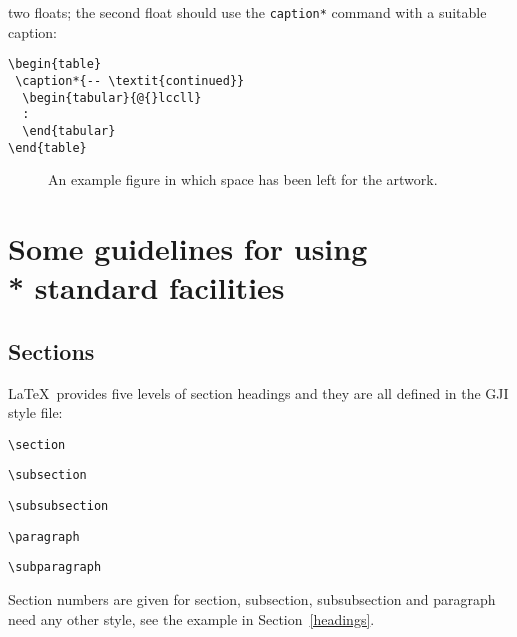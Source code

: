 two floats; the second float should use the \verb"caption*" command with a
suitable caption:
\begin{verbatim}
\begin{table}
 \caption*{-- \textit{continued}}
  \begin{tabular}{@{}lccll}
  :
  \end{tabular}
\end{table}
\end{verbatim}

 \begin{figure}
     \vspace{5.5cm}
     \caption{An example figure in which space has been left for the artwork.}\label{sample-figure}
  \end{figure}

\section[]{Some guidelines for using\\* standard facilities}

\subsection{Sections}

\LaTeX\ provides five levels of section headings and they are all defined in the
GJI style file:
\begin{description}
  \item \verb"\section"
  \item \verb"\subsection"
  \item \verb"\subsubsection"
  \item \verb"\paragraph"
  \item \verb"\subparagraph"
\end{description}

Section numbers are given for section, subsection, subsubsection and paragraph
need any other style, see the example in Section~\ref{headings}.

